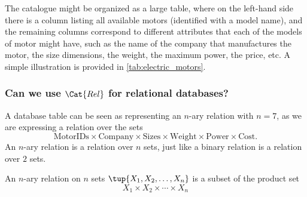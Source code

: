The catalogue might be organized as a large table, where on the left-hand side there is a column listing all available motors (identified with a model name), and the remaining columns correspond to different attributes that each of the models of motor might have, such as the name of the company that manufactures the motor, the size dimensions, the weight, the maximum power, the price, etc. A simple illustration is provided in \cref{tab:electric_motors}.

\begin{table}[h]
    \centering
    \caption{A simplified catalogue of motors.}
    \label{tab:electric_motors}
\end{table}


\subsubsection{Can we use $\Cat{Rel}$ for relational databases?}

A database table can be seen as representing an $n$-ary relation with $n = 7$, as we are expressing a relation
over the sets 
$$
    \text{MotorIDs} \times \text{Company} 
    \times \text{Sizes} \times \text{Weight} \times \text{Power} \times \text{Cost}.
$$
An $n$-ary relation is a relation over $n$ sets, just like a binary relation is a
relation over $2$ sets.
\begin{definition}
An $n$-ary relation on $n$ sets $\tup{X_1, X_2, \dots, X_n}$ is a
subset of the product set 
\begin{equation}
X_1 \times X_2 \times \cdots \times X_n
\end{equation}
\end{definition}

